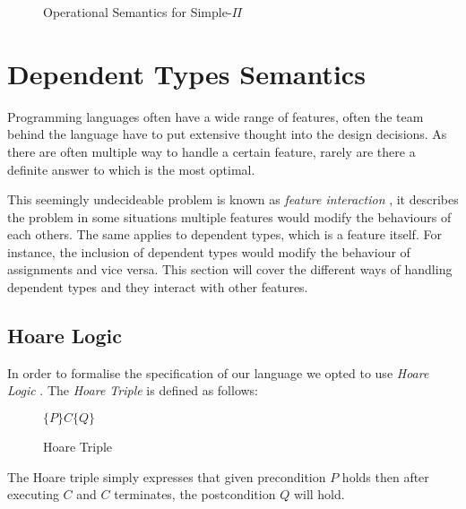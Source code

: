 \documentclass[a4paper,12pt]{report}
\begin{document}
\begin{figure}[H]
\begin{center}
  \end{center}
  \caption{Operational Semantics for Simple-$\Pi$}
\end{figure}

\section{Dependent Types Semantics}
Programming languages often have a wide range of features, often the team behind 
the language have to put extensive thought into the design decisions. As there 
are often multiple way to handle a certain feature, rarely are there a definite 
answer to which is the most optimal.

\par
This seemingly undecideable problem is known as \textit{feature interaction} 
\cite{featInteract}, it describes the problem in some situations multiple 
features would modify the behaviours of each others. The same applies to 
dependent types, which is a feature itself. For instance, the inclusion of dependent types 
would modify the behaviour of assignments and vice versa. This section 
will cover the different ways of handling dependent types and they interact with 
other features.

\subsection{Hoare Logic}
In order to formalise the specification of our language we opted to use 
\textit{Hoare Logic} \cite{hoare}. The \textit{Hoare Triple} is defined as follows: 

\begin{figure}[H]
  \begin{center}
    $\{P\}C\{Q\}$
  \end{center}
  \caption{Hoare Triple}
\end{figure}
The Hoare triple simply expresses that given precondition $P$ holds then after executing $C$ 
and $C$ terminates, the postcondition $Q$ will hold.
\end{document}
